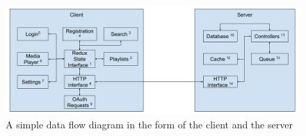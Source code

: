 \begin{figure}[h!]
	\centering
 	\includegraphics[width=\textwidth]{images/ADS-SDS.png}
 \caption{A simple data flow diagram in the form of the client and the server}
\end{figure}
